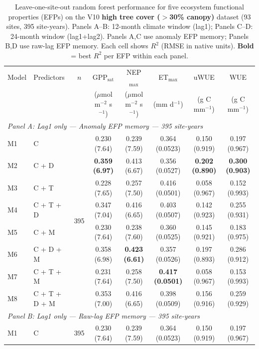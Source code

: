 \begin{table}[htbp]
\centering
\caption{Leave-one-site-out random forest performance for five ecosystem functional properties (EFPs) on the V10 \textbf{high tree cover ($>$30\% canopy)} dataset (93 sites, 395 site-years). Panels A--B: 12-month climate window (lag1); Panels C--D: 24-month window (lag1+lag2). Panels A,C use anomaly EFP memory; Panels B,D use raw-lag EFP memory. Each cell shows $R^2$ (RMSE in native units). \textbf{Bold} = best $R^2$ per EFP within each panel.}
\label{tab:RF_LOSO_v10_filtered}
\footnotesize
\setlength{\tabcolsep}{4pt}
\begin{tabular}{llcccccc}
\toprule
Model & Predictors & $n$ & GPP$_\mathrm{sat}$ & NEP$_\mathrm{max}$ & ET$_\mathrm{max}$ & uWUE & WUE \\
  &  &  & ($\mu$mol m$^{-2}$ s$^{-1}$) & ($\mu$mol m$^{-2}$ s$^{-1}$) & (mm d$^{-1}$) & (g C mm$^{-1}$) & (g C mm$^{-1}$) \\
\midrule
\multicolumn{8}{l}{\textit{Panel A: Lag1 only --- Anomaly EFP memory --- 395 site-years}} \\
\midrule
M1 & C & \multirow{8}{*}{395} & 0.230 (7.64) & 0.239 (7.59) & 0.364 (0.0523) & 0.150 (0.919) & 0.197 (0.967) \\
M2 & C + D &  & \textbf{0.359 (6.97)} & 0.413 (6.67) & 0.356 (0.0527) & \textbf{0.202 (0.890)} & \textbf{0.300 (0.903)} \\
M3 & C + T &  & 0.228 (7.65) & 0.257 (7.50) & 0.416 (0.0501) & 0.058 (0.967) & 0.152 (0.993) \\
M4 & C + T + D &  & 0.347 (7.04) & 0.416 (6.65) & 0.403 (0.0507) & 0.142 (0.923) & 0.255 (0.931) \\
M5 & C + M &  & 0.230 (7.64) & 0.238 (7.60) & 0.360 (0.0525) & 0.145 (0.921) & 0.183 (0.975) \\
M6 & C + D + M &  & 0.358 (6.98) & \textbf{0.423 (6.61)} & 0.357 (0.0526) & 0.197 (0.893) & 0.286 (0.912) \\
M7 & C + T + M &  & 0.231 (7.64) & 0.258 (7.50) & \textbf{0.417 (0.0501)} & 0.058 (0.967) & 0.153 (0.993) \\
M8 & C + T + D + M &  & 0.353 (7.00) & 0.416 (6.65) & 0.398 (0.0509) & 0.156 (0.916) & 0.259 (0.929) \\
\midrule
\multicolumn{8}{l}{\textit{Panel B: Lag1 only --- Raw-lag EFP memory --- 395 site-years}} \\
\midrule
M1 & C & \multirow{8}{*}{395} & 0.230 (7.64) & 0.239 (7.59) & 0.364 (0.0523) & 0.150 (0.919) & 0.197 (0.967) \\

\end{tabular}
\end{table}
